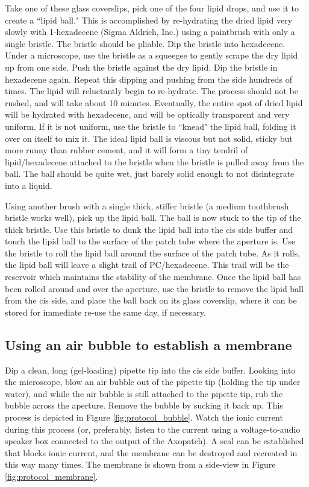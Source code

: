 Take one of these glass coverslips, pick one of the four lipid drops, and use it to create a ``lipid ball."  This is accomplished by re-hydrating the dried lipid very slowly with 1-hexadecene (Sigma Aldrich, Inc.) using a paintbrush with only a single bristle.  The bristle should be pliable.  Dip the bristle into hexadecene.  Under a microscope, use the bristle as a squeegee to gently scrape the dry lipid up from one side.  Push the bristle against the dry lipid.  Dip the bristle in hexadecene again.  Repeat this dipping and pushing from the side hundreds of times.  The lipid will reluctantly begin to re-hydrate.  The process should not be rushed, and will take about \num{10} minutes.  Eventually, the entire spot of dried lipid will be hydrated with hexadecene, and will be optically transparent and very uniform.  If it is not uniform, use the bristle to ``knead" the lipid ball, folding it over on itself to mix it.  The ideal lipid ball is viscous but not solid, sticky but more runny than rubber cement, and it will form a tiny tendril of lipid/hexadecene attached to the bristle when the bristle is pulled away from the ball.  The ball should be quite wet, just barely solid enough to not disintegrate into a liquid.

Using another brush with a single thick, stiffer bristle (a medium toothbrush bristle works well), pick up the lipid ball.  The ball is now stuck to the tip of the thick bristle.  Use this bristle to dunk the lipid ball into the cis side buffer and touch the lipid ball to the surface of the patch tube where the aperture is.  Use the bristle to roll the lipid ball around the surface of the patch tube.  As it rolls, the lipid ball will leave a slight trail of PC/hexadecene.  This trail will be the reservoir which maintains the stability of the membrane.  Once the lipid ball has been rolled around and over the aperture, use the bristle to remove the lipid ball from the cis side, and place the ball back on its glass coverslip, where it can be stored for immediate re-use the same day, if necessary.

\subsection{Using an air bubble to establish a membrane}

Dip a clean, long (gel-loading) pipette tip into the cis side buffer.  Looking into the microscope, blow an air bubble out of the pipette tip (holding the tip under water), and while the air bubble is still attached to the pipette tip, rub the bubble across the aperture.  Remove the bubble by sucking it back up.  This process is depicted in Figure \ref{fig:protocol_bubble}.  Watch the ionic current during this process (or, preferably, listen to the current using a voltage-to-audio speaker box connected to the output of the Axopatch).  A seal can be established that blocks ionic current, and the membrane can be destroyed and recreated in this way many times.  The membrane is shown from a side-view in Figure \ref{fig:protocol_membrane}.


